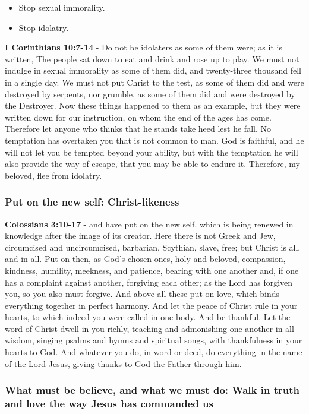 \documentclass[11pt]{article}
\begin{document}
\begin{itemize}
\item Stop sexual immorality.
\item Stop idolatry.
\end{itemize}

\textbf{I Corinthians 10:7-14} - Do not be idolaters as some of them were; as it is written, The people sat down to eat and drink and rose up to play. We must not indulge in sexual immorality as some of them did, and twenty-three thousand fell in a single day. We must not put Christ to the test, as some of them did and were destroyed by serpents, nor grumble, as some of them did and were destroyed by the Destroyer. Now these things happened to them as an example, but they were written down for our instruction, on whom the end of the ages has come. Therefore let anyone who thinks that he stands take heed lest he fall. No temptation has overtaken you that is not common to man. God is faithful, and he will not let you be tempted beyond your ability, but with the temptation he will also provide the way of escape, that you may be able to endure it. Therefore, my beloved, flee from idolatry.

\subsubsection{Put on the new self: Christ-likeness}
\label{sec:org2348964}
\textbf{Colossians 3:10-17} - and have put on the new self, which is being renewed in knowledge after the image of its creator. Here there is not Greek and Jew, circumcised and uncircumcised, barbarian, Scythian, slave, free; but Christ is all, and in all. Put on then, as God's chosen ones, holy and beloved, compassion, kindness, humility, meekness, and patience, bearing with one another and, if one has a complaint against another, forgiving each other; as the Lord has forgiven you, so you also must forgive. And above all these put on love, which binds everything together in perfect harmony. And let the peace of Christ rule in your hearts, to which indeed you were called in one body. And be thankful. Let the word of Christ dwell in you richly, teaching and admonishing one another in all wisdom, singing psalms and hymns and spiritual songs, with thankfulness in your hearts to God. And whatever you do, in word or deed, do everything in the name of the Lord Jesus, giving thanks to God the Father through him.

\subsubsection{What must be believe, and what we must do: Walk in \textbf{truth} and \textbf{love} the way Jesus has commanded us}
\label{sec:org5b3da6e}
\end{document}
